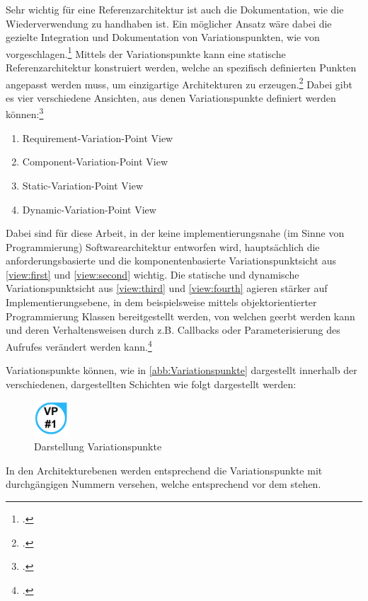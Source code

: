 Sehr wichtig für eine Referenzarchitektur ist auch die Dokumentation, wie die Wiederverwendung zu handhaben ist. Ein möglicher Ansatz wäre dabei die gezielte Integration und Dokumentation von Variationspunkten, wie von \citeauthor{Webber.2001} vorgeschlagen.\footcite[Vgl.][24\psqq]{Webber.2001} Mittels der Variationspunkte kann eine statische Referenzarchitektur konstruiert werden, welche an spezifisch definierten Punkten angepasst werden muss, um einzigartige Architekturen zu erzeugen.\footcite[Vgl.][24]{Webber.2001} Dabei gibt es vier verschiedene Ansichten, aus denen Variationspunkte definiert werden können:\footcite[Vgl.][25\psq]{Webber.2001}
\begin{enumerate}
\item \label{view:first} Requirement-Variation-Point View
\item \label{view:second} Component-Variation-Point View
\item \label{view:third} Static-Variation-Point View
\item \label{view:fourth} Dynamic-Variation-Point View
\end{enumerate}
Dabei sind für diese Arbeit, in der keine implementierungsnahe (im Sinne von Programmierung) Softwarearchitektur entworfen wird, hauptsächlich die anforderungsbasierte und die komponentenbasierte Variationspunktsicht aus \autoref{view:first} und \autoref{view:second} wichtig. Die statische und dynamische Variationspunktsicht aus \autoref{view:third} und \autoref{view:fourth} agieren stärker auf Implementierungsebene, in dem beispielsweise mittels objektorientierter Programmierung Klassen bereitgestellt werden, von welchen geerbt werden kann und deren Verhaltensweisen durch z.B. Callbacks oder Parameterisierung des Aufrufes verändert werden kann.\footcite[Vgl.][25\psq]{Webber.2001} 

\renewcommand\#{\protect\scalebox{0.8}{\protect\raisebox{0.4ex}{\char"0023}}}

Variationspunkte können, wie in \autoref{abb:Variationspunkte} dargestellt innerhalb der verschiedenen, dargestellten Schichten wie folgt dargestellt werden:
\begin{figure}[H]
\centering
\includegraphics[height=1.33cm]{graphics/Variationpoints.pdf}
\caption{Darstellung Variationspunkte}
\label{abb:Variationspunkte}
\end{figure}
In den Architekturebenen werden entsprechend die Variationspunkte mit durchgängigen Nummern versehen, welche entsprechend vor dem \# stehen.






